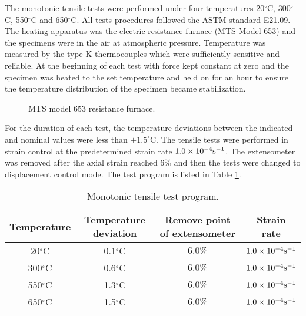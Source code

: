 The monotonic tensile tests were performed under four temperatures 20$^{\circ}$C, 300$^{\circ}$C, 550$^{\circ}$C and 650$^{\circ}$C.
All tests procedures followed the ASTM standard E21.09.
The heating apparatus was the electric resistance furnace (MTS Model 653) and the specimens were in the air at atmospheric pressure.
Temperature was measured by the type K thermocouples which were sufficiently sensitive and reliable.
At the beginning of each test with force kept constant at zero and the specimen was heated to the set temperature and held on for an hour to ensure the temperature distribution of the specimen became stabilization.

\begin{figure}[!htp]
\caption{MTS model 653 resistance furnace.}
\label{Fig:Furnace653_1}
\end{figure}

For the duration of each test, the temperature deviations between the indicated and nominal values were less than $\pm1.5^{\circ}$C.
The tensile tests were performed in strain control at the predetermined strain rate $1.0\times 10^{-4}\rm{s}^{-1}$.
The extensometer was removed after the axial strain reached 6\% and then the tests were changed to displacement control mode.
The test program is listed in Table \ref{tab:TensionLoadingConditions}.
\begin{table}[htbp]
  \centering
  \caption{Monotonic tensile test program.}
    \begin{tabular}{cccc}
    \toprule
    Temperature & Temperature deviation & Remove point of extensometer  & Strain rate  \\
    \midrule
    20$^{\circ}$C  & 0.1$^{\circ}$C & $6.0\%$ & $1.0\times 10^{-4} \rm{s}^{-1}$ \\
    300$^{\circ}$C & 0.6$^{\circ}$C & $6.0\%$ & $1.0\times 10^{-4} \rm{s}^{-1}$ \\
    550$^{\circ}$C & 1.3$^{\circ}$C & $6.0\%$ & $1.0\times 10^{-4} \rm{s}^{-1}$ \\
    650$^{\circ}$C & 1.5$^{\circ}$C & $6.0\%$ & $1.0\times 10^{-4} \rm{s}^{-1}$ \\
    \bottomrule
    \end{tabular}%
  \label{tab:TensionLoadingConditions}%
\end{table}%

